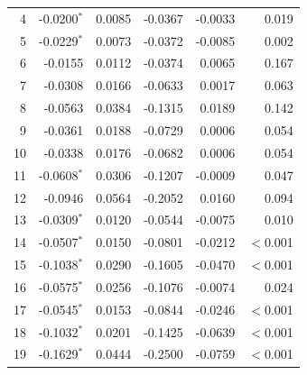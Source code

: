 \begin{longtable}{rrrrrr}
4 & -0.0200$^{*}$ & 0.0085 & -0.0367 & -0.0033 & 0.019 \\
5 & -0.0229$^{*}$ & 0.0073 & -0.0372 & -0.0085 & 0.002 \\
6 & -0.0155 & 0.0112 & -0.0374 & 0.0065 & 0.167 \\
7 & -0.0308 & 0.0166 & -0.0633 & 0.0017 & 0.063 \\
8 & -0.0563 & 0.0384 & -0.1315 & 0.0189 & 0.142 \\
9 & -0.0361 & 0.0188 & -0.0729 & 0.0006 & 0.054 \\
10 & -0.0338 & 0.0176 & -0.0682 & 0.0006 & 0.054 \\
11 & -0.0608$^{*}$ & 0.0306 & -0.1207 & -0.0009 & 0.047 \\
12 & -0.0946 & 0.0564 & -0.2052 & 0.0160 & 0.094 \\
13 & -0.0309$^{*}$ & 0.0120 & -0.0544 & -0.0075 & 0.010 \\
14 & -0.0507$^{*}$ & 0.0150 & -0.0801 & -0.0212 & $<$0.001 \\
15 & -0.1038$^{*}$ & 0.0290 & -0.1605 & -0.0470 & $<$0.001 \\
16 & -0.0575$^{*}$ & 0.0256 & -0.1076 & -0.0074 & 0.024 \\
17 & -0.0545$^{*}$ & 0.0153 & -0.0844 & -0.0246 & $<$0.001 \\
18 & -0.1032$^{*}$ & 0.0201 & -0.1425 & -0.0639 & $<$0.001 \\
19 & -0.1629$^{*}$ & 0.0444 & -0.2500 & -0.0759 & $<$0.001 \\
\end{longtable}
